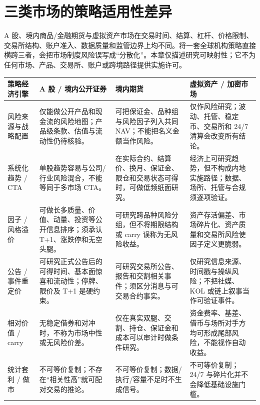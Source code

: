 \section{三类市场的策略适用性差异}

A 股、境内商品/金融期货与虚拟资产市场在交易时间、结算、杠杆、价格限制、交易所结构、账户准入、数据质量和监管边界上均不同。将一套全球机构策略直接横跨三者，会把市场制度风险误写成“分散化”。本章仅描述研究可映射性；它不为任何市场、产品、交易所、账户或跨境路径提供实施许可。

\begin{exhibitbox}
\scriptsize
\begin{tabularx}{\exhibitboxwidth}{L{2.45cm} X X X}
\toprule
\textbf{策略经济引擎} & \textbf{A 股 / 境内公开证券} & \textbf{境内期货} & \textbf{虚拟资产 / 加密市场} \\
\midrule
风险来源与战略配置 & 仅能做公开产品和现金流的风险地图；产品级条款、估值与流动性仍待核验。 & 可把保证金、品种组与风险因子列入共同 NAV；不能把名义金额当作风险。 & 仅作风险研究；波动、托管、稳定币、交易所和 24/7 清算会改变所有结论。 \\
系统化趋势 / CTA & 单股趋势容易与公司/行业风险混合，不能等同于多市场 CTA。 & 在实际合约、结算价、换月、保证金、限仓和交易状态可得时，可做低频纸面研究。 & 经济上可研究趋势，但不构成内地实施路径；数据、场所、托管与合规须逐项验证。 \\
因子 / 风格溢价 & 可做长多质量、价值、动量、投资等公开信息排序；须承认 T+1、涨跌停和无空头腿。 & 可研究跨品种风险分组，但不将期限结构或 carry 误称为无风险收益。 & 资产存活偏差、市场碎片化、资产质量和交易所风险使因子定义更脆弱。 \\
公告 / 事件重定价 & 可研究正式公告后的可得时间、基本面惊喜和流动性；停牌、限价及 T+1 是硬约束。 & 可研究交易所公告、报告和交割相关事件；须区分消息与可交易合约事实。 & 仅研究信息来源、时间戳与操纵风险；不把社媒、KOL 或链上叙事当作可验证事件。 \\
相对价值 / carry & 无稳定借券和对冲时，不称为市场中性或无风险价差。 & 仅在真实双腿、交割、持仓、保证金和成本可以审计时做条件研究。 & 资金费率、基差、借币与场所对手方均可形成尾部风险，不能视作自动收益。 \\
统计套利 / 做市 & 不可等价复制；不存在“相关性高”就可配对交易的推论。 & 不可等价复制；数据/执行/容量不足时不生成信号。 & 不可等价复制；24/7 与碎片化并不会降低基础设施门槛。 \\
\bottomrule
\end{tabularx}
\end{exhibitbox}

